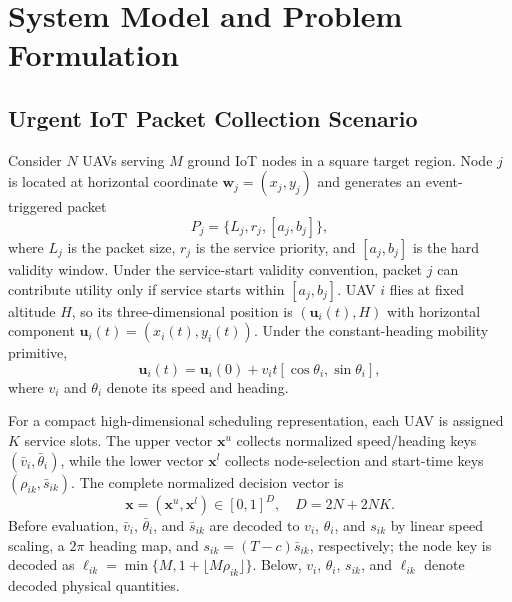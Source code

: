 \documentclass[letterpaper,journal]{IEEEtran}
\begin{document}
\section{System Model and Problem Formulation}
\subsection{Urgent IoT Packet Collection Scenario}
Consider $N$ UAVs serving $M$ ground IoT nodes in a square target region. Node $j$ is located at horizontal coordinate $\mathbf{w}_j=(x_j,y_j)$ and generates an event-triggered packet
\begin{equation}
P_j = \{L_j,r_j,[a_j,b_j]\},
\end{equation}
where $L_j$ is the packet size, $r_j$ is the service priority, and $[a_j,b_j]$ is the hard validity window. Under the service-start validity convention, packet $j$ can contribute utility only if service starts within $[a_j,b_j]$. UAV $i$ flies at fixed altitude $H$, so its three-dimensional position is $(\mathbf{u}_i(t),H)$ with horizontal component $\mathbf{u}_i(t)=(x_i(t),y_i(t))$. Under the constant-heading mobility primitive,
\begin{equation}
\mathbf{u}_i(t)=\mathbf{u}_i(0)+v_i t[\cos\theta_i,\sin\theta_i],
\end{equation}
where $v_i$ and $\theta_i$ denote its speed and heading.

For a compact high-dimensional scheduling representation, each UAV is assigned $K$ service slots. The upper vector $\mathbf{x}^{u}$ collects normalized speed/heading keys $(\bar v_i,\bar\theta_i)$, while the lower vector $\mathbf{x}^{l}$ collects node-selection and start-time keys $(\rho_{ik},\bar s_{ik})$. The complete normalized decision vector is
\begin{equation}
\mathbf{x}=(\mathbf{x}^{u},\mathbf{x}^{l})\in[0,1]^D,\quad D=2N+2NK.
\end{equation}
Before evaluation, $\bar v_i$, $\bar\theta_i$, and $\bar s_{ik}$ are decoded to $v_i$, $\theta_i$, and $s_{ik}$ by linear speed scaling, a $2\pi$ heading map, and $s_{ik}=(T-c)\bar s_{ik}$, respectively; the node key is decoded as $\ell_{ik}=\min\{M,1+\lfloor M\rho_{ik}\rfloor\}$. Below, $v_i$, $\theta_i$, $s_{ik}$, and $\ell_{ik}$ denote decoded physical quantities.
\end{document}

